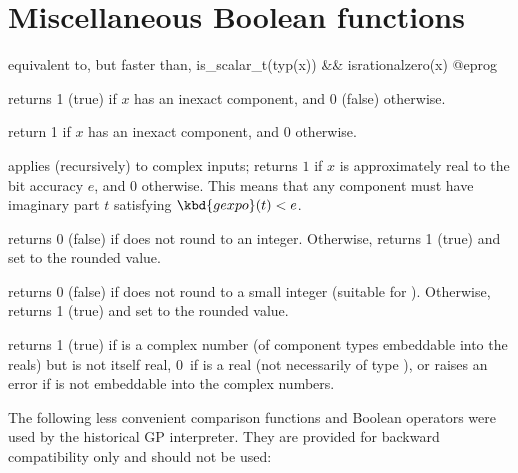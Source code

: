 \section{Miscellaneous Boolean functions}

 equivalent to, but faster than,
\bprog
  is_scalar_t(typ(x)) && isrationalzero(x)
@eprog

 returns 1 (true) if $x$ has an inexact
component, and 0 (false) otherwise.

 return 1 if $x$ has an inexact
 component, and 0  otherwise.

 applies (recursively) to complex inputs;
returns $1$ if $x$ is approximately real to the bit accuracy $e$, and 0
otherwise. This means that any  component must have imaginary part
$t$ satisfying $\kbd{gexpo}(t) < e$.

 returns 0 (false) if  does not round
to an integer. Otherwise, returns 1 (true) and set  to the rounded
value.

 returns 0 (false) if  does not
round to a small integer (suitable for ). Otherwise, returns 1
(true) and set  to the rounded value.

 returns 1 (true) if  is a complex number
(of component types embeddable into the reals) but is not itself real, 0~if
 is a real (not necessarily of type ), or raises an error if
 is not embeddable into the complex numbers.


The following less convenient comparison functions and Boolean operators were
used by the historical GP interpreter. They are provided for backward
compatibility only and should not be used:









